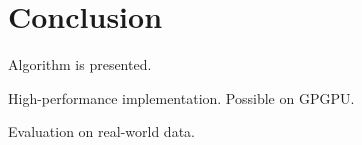 \section{\bf Conclusion}

Algorithm is presented.

High-performance implementation.
Possible on GPGPU.

Evaluation on real-world data.
